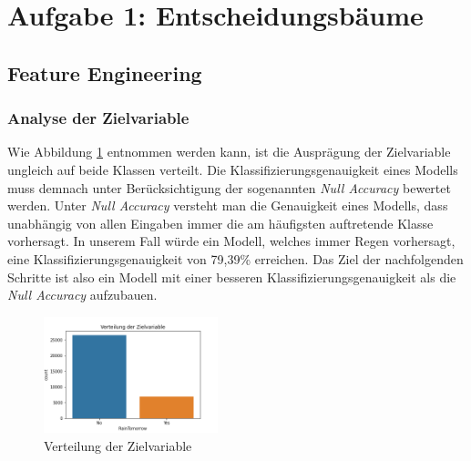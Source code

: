 \section{Aufgabe 1: Entscheidungsbäume}
\subsection{Feature Engineering}

\subsubsection{Analyse der Zielvariable}
Wie Abbildung \ref{fig:disc_target_variable} entnommen werden kann, ist die Ausprägung der Zielvariable ungleich auf beide Klassen verteilt. Die Klassifizierungsgenauigkeit eines Modells muss demnach unter Berücksichtigung der sogenannten \emph{Null Accuracy} bewertet werden. Unter \emph{Null Accuracy} versteht man die Genauigkeit eines Modells, dass unabhängig von allen Eingaben immer die am häufigsten auftretende Klasse vorhersagt. In unserem Fall würde ein Modell, welches immer Regen vorhersagt, eine Klassifizierungsgenauigkeit von 79,39\% erreichen. Das Ziel der nachfolgenden Schritte ist also ein Modell mit einer besseren Klassifizierungsgenauigkeit als die \emph{Null Accuracy} aufzubauen.
\begin{figure}[ht]
	\centering
	\includegraphics[width = 0.45\textwidth]{Bilder/distribution_target_variable.png}
	\caption{Verteilung der Zielvariable}
	\label{fig:disc_target_variable}
\end{figure}
